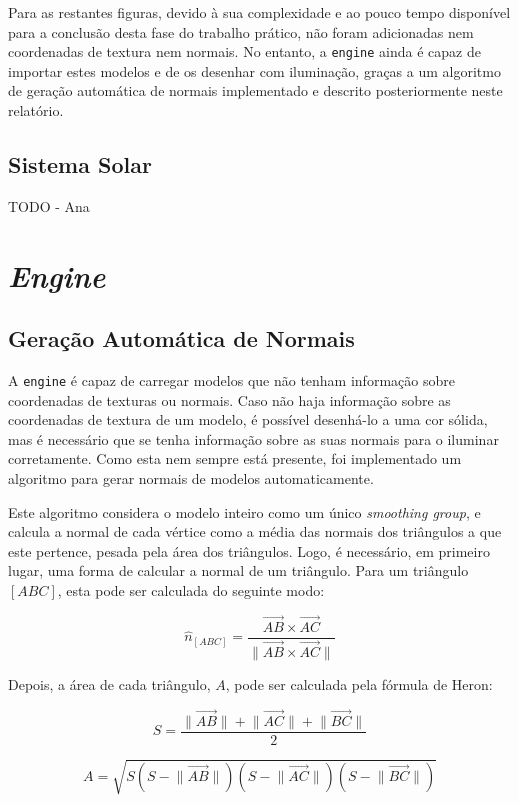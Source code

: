 \documentclass[12pt, a4paper]{article}
\begin{document}
Para as restantes figuras, devido à sua complexidade e ao pouco tempo disponível para a conclusão
desta fase do trabalho prático, não foram adicionadas nem coordenadas de textura nem normais. No
entanto, a \texttt{engine} ainda é capaz de importar estes modelos e de os desenhar com iluminação,
graças a um algoritmo de geração automática de normais implementado e descrito posteriormente neste
relatório.

\subsection{Sistema Solar}

{\color{red} TODO - Ana}

\section{\emph{Engine}}

\subsection{Geração Automática de Normais}

A \texttt{engine} é capaz de carregar modelos que não tenham informação sobre coordenadas de
texturas ou normais. Caso não haja informação sobre as coordenadas de textura de um modelo, é
possível desenhá-lo a uma cor sólida, mas é necessário que se tenha informação sobre as suas normais
para o iluminar corretamente. Como esta nem sempre está presente, foi implementado um algoritmo para
gerar normais de modelos automaticamente.

Este algoritmo considera o modelo inteiro como um único \emph{smoothing group}, e calcula a normal
de cada vértice como a média das normais dos triângulos a que este pertence, pesada pela área dos
triângulos. Logo, é necessário, em primeiro lugar, uma forma de calcular a normal de um triângulo.
Para um triângulo $[ABC]$, esta pode ser calculada do seguinte modo:

$$
\hat{n}_{[ABC]} = \frac{
    \overrightarrow{AB} \times \overrightarrow{AC}
}{
    \lVert \overrightarrow{AB} \times \overrightarrow{AC} \rVert
}
$$

Depois, a área de cada triângulo, $A$, pode ser calculada pela fórmula de Heron:

$$
S = \frac{
    \lVert \overrightarrow{AB} \rVert +
    \lVert \overrightarrow{AC} \rVert +
    \lVert \overrightarrow{BC} \rVert
}{
    2
}
$$

$$
A = \sqrt{
    S
    \left ( S - \lVert \overrightarrow{AB} \rVert \right )
    \left ( S - \lVert \overrightarrow{AC} \rVert \right )
    \left ( S - \lVert \overrightarrow{BC} \rVert \right )
}
$$
\end{document}
